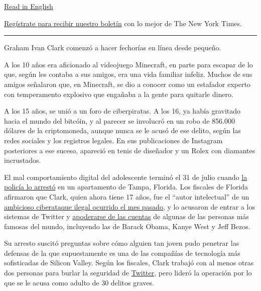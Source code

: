 \href{https://www.nytimes.com/2020/08/02/technology/florida-teenager-twitter-hack.html}{Read
in English}

\href{https://www.nytimes.com/newsletters/el-times}{Regístrate para
recibir nuestro boletín} con lo mejor de The New York Times.

\begin{center}\rule{0.5\linewidth}{\linethickness}\end{center}

Graham Ivan Clark comenzó a hacer fechorías en línea desde pequeño.

A los 10 años era aficionado al videojuego Minecraft, en parte para
escapar de lo que, según les contaba a sus amigos, era una vida familiar
infeliz. Muchos de sus amigos señalaron que, en Minecraft, se dio a
conocer como un estafador experto con temperamento explosivo que
engañaba a la gente para quitarle dinero.

A los 15 años, se unió a un foro de ciberpiratas. A los 16, ya había
gravitado hacia el mundo del bitcóin, y al parecer se involucró en un
robo de 856.000 dólares de la criptomoneda, aunque nunca se le acusó de
ese delito, según las redes sociales y los registros legales. En sus
publicaciones de Instagram posteriores a ese suceso, apareció en tenis
de diseñador y un Rolex con diamantes incrustados.

El mal comportamiento digital del adolescente terminó el 31 de julio
cuando
\href{https://www.nytimes.com/2020/07/31/technology/twitter-hack-arrest.html}{la
policía lo arrestó} en un apartamento de Tampa, Florida. Los fiscales de
Florida afirmaron que Clark, quien ahora tiene 17 años, fue el ``autor
intelectual'' de un
\href{https://www.nytimes.com/2020/07/17/technology/twitter-hackers-interview.html}{ambicioso
ciberataque ilegal ocurrido el mes pasado}, y lo acusaron de entrar a
los sistemas de Twitter y
\href{https://www.nytimes.com/2020/07/15/technology/twitter-hack-bill-gates-elon-musk.html}{apoderarse
de las cuentas} de algunas de las personas más famosas del mundo,
incluyendo las de Barack Obama, Kanye West y Jeff Bezos.

Su arresto suscitó preguntas sobre cómo alguien tan joven pudo penetrar
las defensas de la que supuestamente es una de las compañías de
tecnología más sofisticadas de Silicon Valley. Según los fiscales, Clark
trabajó con al menos otras dos personas para burlar la seguridad de
\href{https://www.nytimes.com/2020/08/03/technology/ftc-twitter-privacy-violations.html}{Twitter},
pero lideró la operación por lo que se le acusa como adulto de 30
delitos graves.

